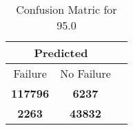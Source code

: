 \begin{table}[] 
\caption{Confusion Matric for 95.0} 
\label{Table: Prediction Accuracy-DMD95.0OnlySunEKF-resetReflection-Reflection} 
\centering 
\begin{tabular} 
 {@{}ccc@{}} 
\toprule 
\multicolumn{2}{c}{\textbf{Predicted}}
 \\ \midrule 
\multicolumn{1}{|c|}{Failure} & 
\multicolumn{1}{c|}{No Failure}
 \\ \midrule 
\multicolumn{1}{|c|}{\color{green}\textbf{117796}} & 
\multicolumn{1}{c|}{\color{red}\textbf{6237}}
 \\ \midrule 
\multicolumn{1}{|c|}{\color{red}\textbf{2263}} & 
\multicolumn{1}{c|}{\color{green}\textbf{43832}}
 \\ \bottomrule 
\end{tabular} 
\end{table} 
